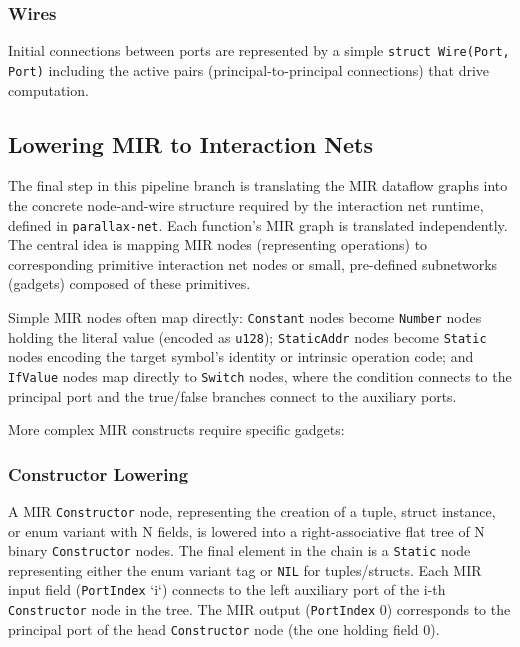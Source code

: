 \subsubsection{Wires}
Initial connections between ports are represented by a simple \texttt{struct Wire(Port, Port)} including the active pairs (principal-to-principal connections) that drive computation.

\subsection{Lowering MIR to Interaction Nets}

The final step in this pipeline branch is translating the MIR dataflow graphs into the concrete node-and-wire structure required by the interaction net runtime, defined in \texttt{parallax-net}. Each function's MIR graph is translated independently. The central idea is mapping MIR nodes (representing operations) to corresponding primitive interaction net nodes or small, pre-defined subnetworks (gadgets) composed of these primitives.

Simple MIR nodes often map directly: \texttt{Constant} nodes become \texttt{Number} nodes holding the literal value (encoded as \texttt{u128}); \texttt{StaticAddr} nodes become \texttt{Static} nodes encoding the target symbol's identity or intrinsic operation code; and \texttt{IfValue} nodes map directly to \texttt{Switch} nodes, where the condition connects to the principal port and the true/false branches connect to the auxiliary ports.

More complex MIR constructs require specific gadgets:

\subsubsection{Constructor Lowering}

A MIR \texttt{Constructor} node, representing the creation of a tuple, struct instance, or enum variant with N fields, is lowered into a right-associative flat tree of N binary \texttt{Constructor} nodes. The final element in the chain is a \texttt{Static} node representing either the enum variant tag or \texttt{NIL} for tuples/structs. Each MIR input field (\texttt{PortIndex} `i`) connects to the left auxiliary port of the i-th \texttt{Constructor} node in the tree. The MIR output (\texttt{PortIndex} 0) corresponds to the principal port of the head \texttt{Constructor} node (the one holding field 0).


